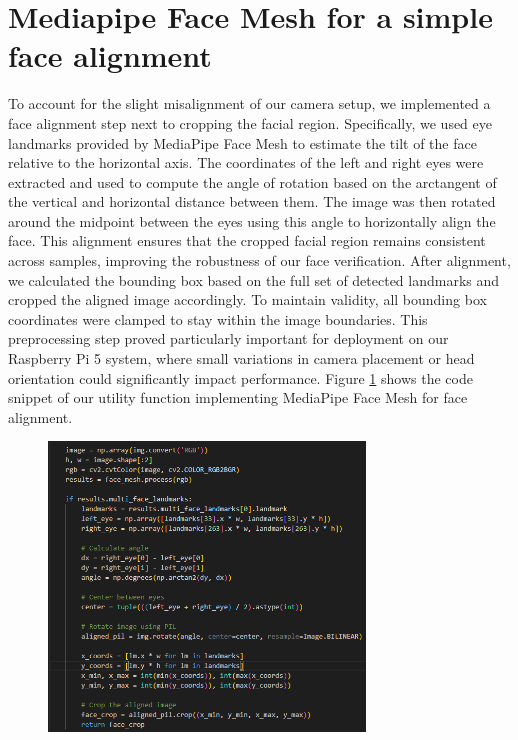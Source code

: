 \section{Mediapipe Face Mesh for a simple face alignment}
To account for the slight misalignment of our camera setup, we implemented a face alignment step next to cropping the facial region. Specifically, we used eye landmarks provided by MediaPipe Face Mesh to estimate the tilt of the face relative to the horizontal axis. The coordinates of the left and right eyes were extracted and used to compute the angle of rotation based on the arctangent of the vertical and horizontal distance between them. The image was then rotated around the midpoint between the eyes using this angle to horizontally align the face. 
This alignment ensures that the cropped facial region remains consistent across samples, improving the robustness of our face verification. After alignment, we calculated the bounding box based on the full set of detected landmarks and cropped the aligned image accordingly. To maintain validity, all bounding box coordinates were clamped to stay within the image boundaries. This preprocessing step proved particularly important for deployment on our Raspberry Pi 5 system, where small variations in camera placement or head orientation could significantly impact performance. Figure \ref{fig:mp_face_mesh} shows the code snippet of our utility function implementing MediaPipe Face Mesh for face alignment. 
\begin{figure}[h] %
	\centering
	\includegraphics[width=0.75\textwidth]{figures/chapter4/mp_face_mesh.png} %
	\caption{}
	\label{fig:mp_face_mesh}
\end{figure}


